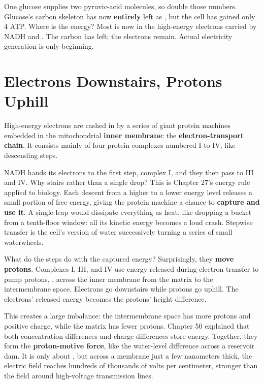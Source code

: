 One glucose supplies two pyruvic-acid molecules, so double those numbers. Glucose's carbon skeleton has now \textbf{entirely} left as , but the cell has gained only 4 ATP. Where is the energy? Most is now in the high-energy electrons carried by NADH and . The carbon has left; the electrons remain. Actual electricity generation is only beginning.

\section{Electrons Downstairs, Protons Uphill}

High-energy electrons are cashed in by a series of giant protein machines embedded in the mitochondrial \textbf{inner membrane}: the \textbf{electron-transport chain}. It consists mainly of four protein complexes numbered I to IV, like descending steps.

NADH hands its electrons to the first step, complex I, and they then pass to III and IV. Why stairs rather than a single drop? This is Chapter 27's energy rule applied to biology. Each descent from a higher to a lower energy level releases a small portion of free energy, giving the protein machine a chance to \textbf{capture and use it}. A single leap would dissipate everything as heat, like dropping a bucket from a tenth-floor window: all its kinetic energy becomes a loud crash. Stepwise transfer is the cell's version of water successively turning a series of small waterwheels.

What do the steps do with the captured energy? Surprisingly, they \textbf{move protons}. Complexes I, III, and IV use energy released during electron transfer to pump protons, , across the inner membrane from the matrix to the intermembrane space. Electrons go downstairs while protons go uphill. The electrons' released energy becomes the protons' height difference.

This creates a large imbalance: the intermembrane space has more protons and positive charge, while the matrix has fewer protons. Chapter 50 explained that both concentration differences and charge differences store energy. Together, they form the \textbf{proton-motive force}, like the water-level difference across a reservoir dam. It is only about , but across a membrane just a few nanometers thick, the electric field reaches hundreds of thousands of volts per centimeter, stronger than the field around high-voltage transmission lines.

